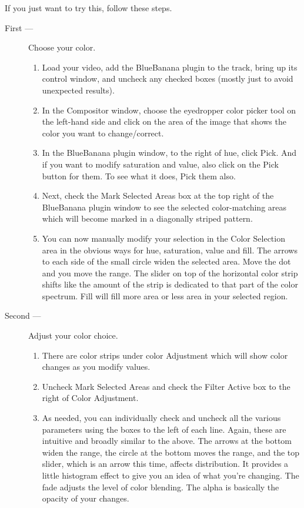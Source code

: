 If you just want to try this, follow these steps.

\begin{description}
    \item[First ---] Choose your color.
    \begin{enumerate}
        \item Load your video, add the BlueBanana plugin to the track, bring up its control window, and uncheck any checked boxes (mostly just to avoid unexpected results).
        \item In the Compositor window, choose the eyedropper color picker tool on the left-hand side and click on the area of the image that shows the color you want to change/correct.
        \item In the BlueBanana plugin window, to the right of hue, click Pick. And if you want to modify saturation and value, also click on the Pick button for them. To see what it does, Pick them also.
        \item Next, check the Mark Selected Areas box at the top right of the BlueBanana plugin window to see the selected color-matching areas which will become marked in a diagonally striped pattern.
        \item You can now manually modify your selection in the Color Selection area in the obvious ways for hue, saturation, value and fill. The arrows to each side of the small circle widen the selected area. Move the dot and you move the range. The slider on top of the horizontal color strip shifts like the amount of the strip is dedicated to that part of the color spectrum. Fill will fill more area or less area in your selected region.
    \end{enumerate}
    \item[Second ---] Adjust your color choice.
    \begin{enumerate}
        \item There are color strips under color Adjustment which will show color changes as you modify values.
        \item Uncheck Mark Selected Areas and check the Filter Active box to the right of Color Adjustment.
        \item As needed, you can individually check and uncheck all the various parameters using the boxes to the left of each line. Again, these are intuitive and broadly similar to the above. The arrows at the bottom widen the range, the circle at the bottom moves the range, and the top slider, which is an arrow this time, affects distribution. It provides a little histogram effect to give you an idea of what you're changing. The fade adjusts the level of color blending. The alpha is basically the opacity of your changes.
    \end{enumerate}
\end{description}

